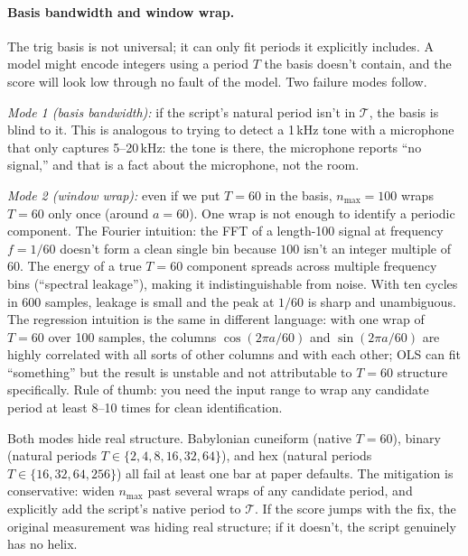 \documentclass[10pt,letterpaper]{article}
\begin{document}
\paragraph{Basis bandwidth and window wrap.} The trig basis is not
universal; it can only fit periods it explicitly includes. A model
might encode integers using a period $T$ the basis doesn't contain,
and the score will look low through no fault of the model. Two
failure modes follow.

\emph{Mode 1 (basis bandwidth):} if the script's natural period
isn't in $\mathcal{T}$, the basis is blind to it. This is analogous
to trying to detect a 1\,kHz tone with a microphone that only
captures 5--20\,kHz: the tone is there, the microphone reports ``no
signal,'' and that is a fact about the microphone, not the room.

\emph{Mode 2 (window wrap):} even if we put $T = 60$ in the basis,
$n_{\max} = 100$ wraps $T = 60$ only once (around $a = 60$). One wrap
is not enough to identify a periodic component. The Fourier
intuition: the FFT of a length-100 signal at frequency $f = 1/60$
doesn't form a clean single bin because $100$ isn't an integer
multiple of $60$. The energy of a true $T = 60$ component spreads
across multiple frequency bins (``spectral leakage''), making it
indistinguishable from noise. With ten cycles in 600 samples,
leakage is small and the peak at $1/60$ is sharp and unambiguous.
The regression intuition is the same in different language: with one
wrap of $T = 60$ over 100 samples, the columns $\cos(2\pi a/60)$ and
$\sin(2\pi a/60)$ are highly correlated with all sorts of other
columns and with each other; OLS can fit ``something'' but the
result is unstable and not attributable to $T = 60$ structure
specifically. Rule of thumb: you need the input range to wrap any
candidate period at least 8--10 times for clean identification.

Both modes hide real structure. Babylonian cuneiform (native $T =
60$), binary (natural periods $T \in \{2,4,8,16,32,64\}$), and hex
(natural periods $T \in \{16,32,64,256\}$) all fail at least one bar
at paper defaults. The mitigation is conservative: widen $n_{\max}$
past several wraps of any candidate period, and explicitly add the
script's native period to $\mathcal{T}$. If the score jumps with the
fix, the original measurement was hiding real structure; if it
doesn't, the script genuinely has no helix.
\end{document}
